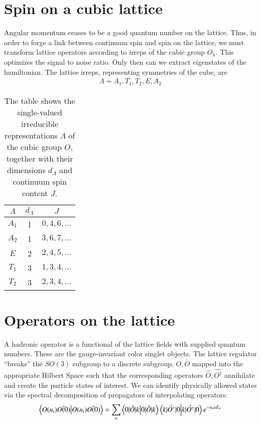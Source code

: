\section{Spin on a cubic lattice}
Angular momentum ceases to be a good quantum number on the lattice. Thus, in order to forge a link between continuum spin and spin on the lattice, we must transform lattice operators according to irreps of the cubic group $O_h$. This optimizes the signal to noise ratio. Only then can we extract eigenstates of the hamiltonian. The lattice irreps, representing symmetries of the cube, are
\begin{align}
    \Lambda = {A_1,T_1,T_2,E,A_2}
\end{align}
\begin{table}
    \begin{tabular}{ccc}
    $\Lambda$ & $d_{\Lambda}$ & $J$\\ \hline
    $A_1$ & 1 & $0,4,6,\dots$\\
    $A_2$ & 1 & $3,6,7,\dots$\\
    $E$ & 2 & $2,4,5,\dots$\\
    $T_1$ & 3 & $1,3,4,\dots$\\
    $T_2$ & 3 & $2,3,4,\dots$\\ \hline
    \end{tabular}
    \caption{The table shows the single-valued irreducible representations
      $\Lambda$ of the cubic group $O$, together with their dimensions
      $d_\Lambda$ and continuum spin content $J$\protect.\label{tab:irrep}}
    \end{table}

\section{Operators on the lattice}
A hadronic operator is a functional of the lattice fields with supplied quantum numbers. These are the gauge-invariant color singlet objects. The lattice regulator ``breaks'' the $SO(3)$ subgroup to a discrete subgroup. $O,\bar{O}$ mapped into the appropriate Hilbert Space such that the corresponding operators $\hat{O} ,\hat{O^\dagger}$  annihilate and create the particle states of interest. We can identify physically allowed states via the spectral decomposition of propagators of interpolating operators: 
\begin{equation}
\braket{O(n_t)\bar{O(0)}} = \sum_{n}\braket{0|\hat{O}|k} \braket{k|\hat{O^{\dagger}}|0} e^{-n_taE_k}
\end{equation}

